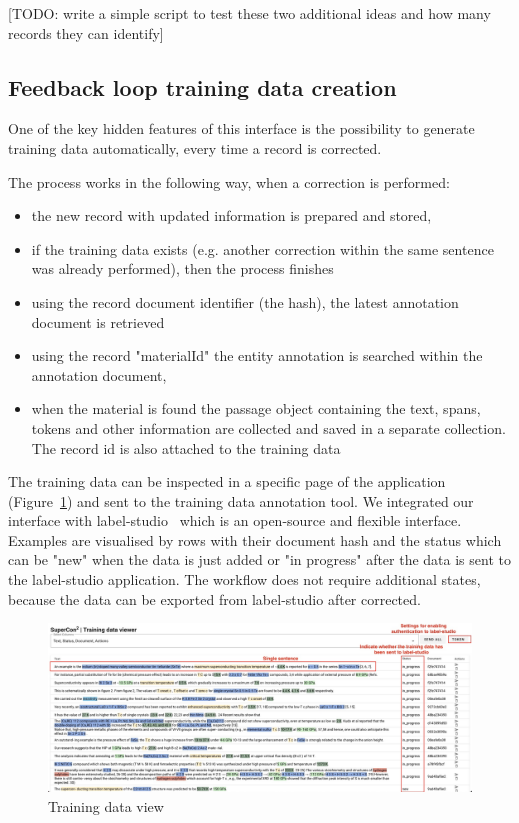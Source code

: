 \documentclass[a4paper]{article}
\begin{document}
[TODO: write a simple script to test these two additional ideas and how many records they can identify]

\subsection{Feedback loop training data creation}

One of the key hidden features of this interface is the possibility to generate training data automatically, every time a record is corrected. 

The process works in the following way, when a correction is performed:
\begin{itemize}
    \item the new record with updated information is prepared and stored, 
    \item if the training data exists (e.g. another correction within the same sentence was already performed), then the process finishes
    \item using the record document identifier (the hash), the latest annotation document is retrieved
    \item using the record "materialId" the entity annotation is searched within the annotation document,
    \item when the material is found the passage object containing the text, spans, tokens and other information are collected and saved in a separate collection. The record id is also attached to the training data 
\end{itemize}

The training data can be inspected in a specific page of the application (Figure~\ref{fig:training-data-view}) and sent to the training data annotation tool. We integrated our interface with label-studio~\cite{Label_Studio} which is an open-source and flexible interface. 
Examples are visualised by rows with their document hash and the status which can be "new" when the data is just added or "in progress" after the data is sent to the label-studio application. 
The workflow does not require additional states, because the data can be exported from label-studio after corrected. 


\begin{figure}[ht]
  \centering
  \includegraphics[width=1\textwidth]{images/training-data-viewer} 
  \caption{Training data view}
  \label{fig:training-data-view}
\end{figure}
\end{document}
